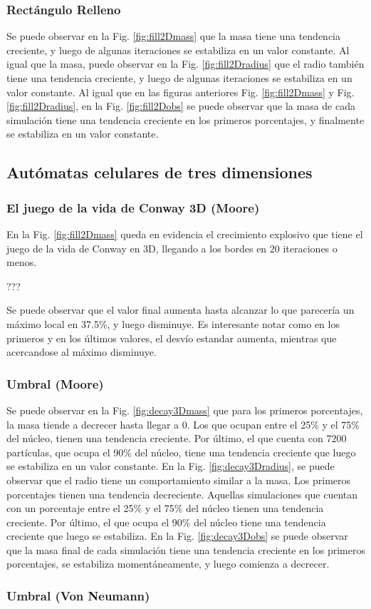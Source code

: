 \subsubsection{Rectángulo Relleno}
Se puede observar en la Fig. \ref{fig:fill2Dmass} que la masa tiene una tendencia creciente, y luego de algunas iteraciones se estabiliza en un valor constante.
Al igual que la masa, puede observar en la Fig. \ref{fig:fill2Dradius} que el radio también tiene una tendencia creciente, y luego de algunas iteraciones se estabiliza en un valor constante.
Al igual que en las figuras anteriores Fig. \ref{fig:fill2Dmass} y Fig. \ref{fig:fill2Dradius}, en la Fig. \ref{fig:fill2Dobs} se puede observar que la masa de cada simulación tiene una tendencia creciente en los primeros porcentajes, y finalmente se estabiliza en un valor constante.

\subsection{Autómatas celulares de tres dimensiones}
\label{subsec:results3d}

\subsubsection{El juego de la vida de Conway 3D (Moore)}
En la Fig. \ref{fig:fill2Dmass} queda en evidencia el crecimiento explosivo que tiene el juego de la vida de Conway en 3D, llegando a los bordes en 20 iteraciones o menos.

???

Se puede observar que el valor final aumenta hasta alcanzar lo que parecería un máximo local en 37.5\%, y luego disminuye.
Es interesante notar como en los primeros y en los últimos valores, el desvío estandar aumenta, mientras que acercandose al máximo disminuye.


\subsubsection{Umbral (Moore)}
Se puede observar en la Fig. \ref{fig:decay3Dmass} que para los primeros porcentajes, la masa tiende a decrecer hasta llegar a $0$.
Los que ocupan entre el 25\% y el 75\% del núcleo, tienen una tendencia creciente.
Por último, el que cuenta con 7200 partículas, que ocupa el 90\% del núcleo, tiene una tendencia creciente que luego se estabiliza en un valor constante.
En la Fig. \ref{fig:decay3Dradius}, se puede observar que el radio tiene un comportamiento similar a la masa.
Los primeros porcentajes tienen una tendencia decreciente.
Aquellas simulaciones que cuentan con un porcentaje entre el 25\% y el 75\% del núcleo tienen una tendencia creciente.
Por último, el que ocupa el 90\% del núcleo tiene una tendencia creciente que luego se estabiliza.
En la Fig. \ref{fig:decay3Dobs} se puede observar que la masa final de cada simulación tiene una tendencia creciente en los primeros porcentajes, se estabiliza momentáneamente, y luego comienza a decrecer.

\subsubsection{Umbral (Von Neumann)}
